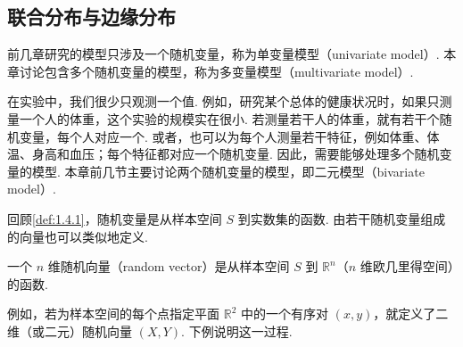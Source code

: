 \subsection{联合分布与边缘分布}\label{sec:4.1}
前几章研究的模型只涉及一个随机变量，称为单变量模型（univariate model）. 本章讨论包含多个随机变量的模型，称为多变量模型（multivariate model）.

在实验中，我们很少只观测一个值. 例如，研究某个总体的健康状况时，如果只测量一个人的体重，这个实验的规模实在很小. 若测量若干人的体重，就有若干个随机变量，每个人对应一个. 或者，也可以为每个人测量若干特征，例如体重、体温、身高和血压；每个特征都对应一个随机变量. 因此，需要能够处理多个随机变量的模型. 本章前几节主要讨论两个随机变量的模型，即二元模型（bivariate model）.

回顾\autoref{def:1.4.1}，随机变量是从样本空间 $S$ 到实数集的函数. 由若干随机变量组成的向量也可以类似地定义.
\begin{definition}\label{def:4.1.1}
一个 $n$ 维随机向量（random vector）是从样本空间 $S$ 到 $\mathbb R^n$（$n$ 维欧几里得空间）的函数.
\end{definition}
例如，若为样本空间的每个点指定平面 $\mathbb R^2$ 中的一个有序对 $(x,y)$，就定义了二维（或二元）随机向量 $(X,Y)$. 下例说明这一过程.
